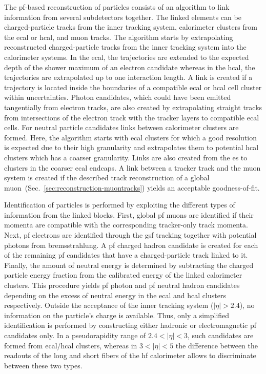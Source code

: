 The \gls{pf}-based reconstruction of particles consists of an algorithm to link information from several subdetectors together. The linked elements can be charged-particle tracks from the inner tracking system, calorimeter clusters from the \gls{ecal} or \gls{hcal}, and muon tracks. The algorithm starts by extrapolating reconstructed charged-particle tracks from the inner tracking system into the calorimeter systems. In the \gls{ecal}, the trajectories are extended to the expected depth of the shower maximum of an electron candidate whereas in the \gls{hcal}, the trajectories are extrapolated up to one interaction length. A link is created if a trajectory is located inside the boundaries of a compatible \gls{ecal} or \gls{hcal} cell cluster within uncertainties. Photon candidates, which could have been emitted tangentially from electron tracks, are also created by extrapolating straight tracks from intersections of the electron track with the tracker layers to compatible \gls{ecal} cells. For neutral particle candidates links between calorimeter clusters are formed. Here, the algorithm starts with \gls{ecal} clusters for which a good resolution is expected due to their high granularity and extrapolates them to potential \gls{hcal} clusters which has a coarser granularity. Links are also created from the \gls{es} to clusters in the coarser \gls{ecal} endcaps. A link between a tracker track and the muon system is created if the described track reconstruction of a global muon~(Sec.~\ref{sec:reconstruction-muontracks}) yields an acceptable goodness-of-fit.

Identification of particles is performed by exploiting the different types of information from the linked blocks. First, global \gls{pf} muons are identified if their momenta are compatible with the corresponding tracker-only track momenta. Next, \gls{pf} electrons are identified through the \gls{gsf} tracking together with potential photons from bremsstrahlung. A \gls{pf} charged hadron candidate is created for each of the remaining \gls{pf} candidates that have a charged-particle track linked to it. Finally, the amount of neutral energy is determined by subtracting the charged particle energy fraction from the calibrated energy of the linked calorimeter clusters. This procedure yields \gls{pf} photon and \gls{pf} neutral hadron candidates depending on the excess of neutral energy in the \gls{ecal} and \gls{hcal} clusters respectively. Outside the acceptance of the inner tracking system ($|\eta|>2.4$), no information on the particle's charge is available. Thus, only a simplified identification is performed by constructing either hadronic or electromagnetic \gls{pf} candidates only. In a pseudorapidity range of $2.4<|\eta|<3$, such candidates are formed from \gls{ecal}/\gls{hcal} clusters, whereas in $3<|\eta|<5$ the difference between the readouts of the long and short fibers of the \gls{hf} calorimeter allows to discriminate between these two types.

